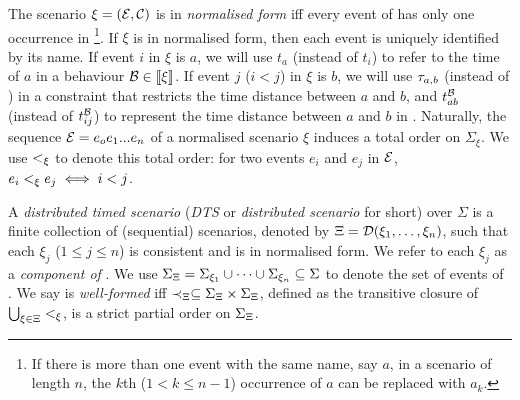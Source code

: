 The scenario $\xi=(\mathcal{E},\mathcal{C})$ is in \emph{normalised form} iff
every event of \E{} has only one occurrence in \E{}\footnote{
If there is more than one event with the same name, say $a$, in a scenario
of length $n$, the $k$th ($1<k\leq n-1$) occurrence of
$a$ can be replaced with $a_{k}$.}.
If $\xi$ is in normalised form, then each event is uniquely
identified by its name.
If event $i$ in $\xi$ is $a$, we will use $t_a$
(instead of $t_i$) to refer to the time of $a$ in a behaviour
$\mathcal{B}\in \llbracket \xi \rrbracket$. If event $j$ ($i<j$) in
$\xi$ is $b$, we will use $\tau_{a,b}$ (instead of ) in a
constraint that restricts the time distance between $a$ and $b$, and
$t_{ab}^{\mathcal{B}}$ (instead of $t_{ij}^{\mathcal{B}}$) to
represent the time distance between $a$ and $b$ in .
Naturally, the sequence $\mathcal{E} = e_o e_1 ... e_{n}$ of a normalised scenario $\xi$ induces a
total order on $\Sigma_{\xi}$. We use $<_{\xi}$ to denote this
total order: for two events $e_i$ and $e_j$ in
$\mathcal{E}$, $e_i <_{\xi} e_j \iff i < j$.

A \emph{distributed timed scenario} (\emph{DTS} or \emph{distributed
scenario} for short) over $\Sigma$ is a finite collection of
(sequential) scenarios, denoted by $\Xi=\mathcal{D}(\xi_1,\dots,\xi_n)$,
such that each $\xi_j$ ($1\leq j \leq n$) is consistent and is in
normalised form.
We refer to each $\xi_j$ as a \emph{component of} \DScenario.
  We use $\Sigma_{\Xi} = \Sigma_{\xi_1} \cup \dots \cup
  \Sigma_{\xi_n}\subseteq\Sigma$ to denote the set of events of \DScenario.
  We say \DScenario{} %
is \emph{well-formed} iff $\prec_{\Xi}\subseteq \Sigma_{\Xi} \times
\Sigma_{\Xi}$, defined as the transitive closure of $\bigcup_{\xi \in \Xi}
<_{\xi}$, is a strict partial order on $\Sigma_{\Xi}$.

